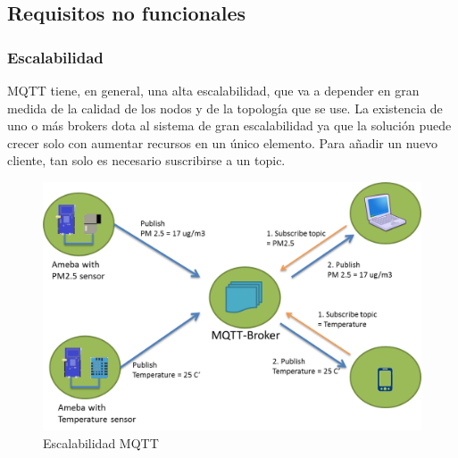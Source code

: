 \documentclass[12pt, twoside]{book}
\begin{document}
\subsection{Requisitos no funcionales}
\subsubsection*{Escalabilidad}
MQTT tiene, en general, una alta escalabilidad, que va a depender en gran medida de la calidad de los nodos y de la topología que se use. La existencia de uno o más brokers dota al sistema de gran escalabilidad ya que la solución puede crecer solo con aumentar recursos en un único elemento.
Para añadir un nuevo cliente, tan solo es necesario suscribirse a un topic.
\begin{figure}[h!]
\centering
\includegraphics[scale=0.3]{images/figure3.png}
\caption{Escalabilidad MQTT}\label{L403}
\end{figure}
\end{document}
